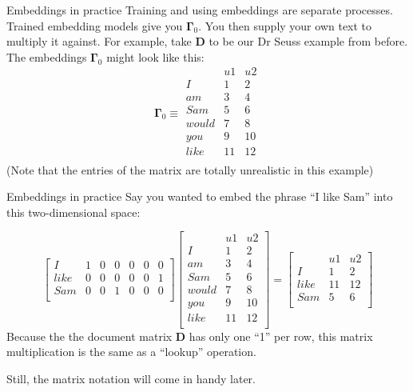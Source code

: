 \documentclass[10pt]{beamer}
\begin{document}
\begin{frame}{Embeddings in practice}
Training and using embeddings are separate processes.  Trained embedding models give you $\bm{\Gamma}_0$.  You then supply your own text to multiply it against.  For example, take $\bm{D}$ to be our Dr Seuss example from before.  The embeddings $\bm\Gamma_0$ might look like this:
\[  \bm{\Gamma}_0 \equiv
\begin{array}{c|cccccc}
     & u1 & u2 \\
     \hline
I    & 1 & 2 \\
am   & 3 & 4  \\
Sam  & 5 & 6   \\
would& 7 & 8  \\
you  & 9 & 10  \\
like & 11 & 12  \\
\end{array}\] 
(Note that the entries of the matrix are totally unrealistic in this example)

\end{frame}

\begin{frame}{Embeddings in practice}
Say you wanted to embed the phrase ``I like Sam'' into this two-dimensional space:

\[ 
\left[
\begin{array}{c|cccccc}
I    & 1 & 0  & 0   & 0     & 0   &  0 \\
like & 0 & 0  & 0   & 0     & 0   &  1 \\
Sam  & 0 & 0  & 1   & 0     & 0   &  0 \\
\end{array}\right]
\left[\begin{array}{c|cccccc}
     & u1 & u2 \\
     \hline
I    & 1 & 2 \\
am   & 3 & 4  \\
Sam  & 5 & 6   \\
would& 7 & 8  \\
you  & 9 & 10  \\
like & 11 & 12  \\
\end{array}\right] = 
\left[
\begin{array}{c|cccccc}
     & u1 & u2 \\
     \hline
I    & 1 & 2 \\
like & 11 & 12  \\
Sam  & 5 & 6   \\
\end{array}
\right]
\] 
Because the the document matrix $\bm{D}$ has only one ``1'' per row, this matrix multiplication is the same as a ``lookup'' operation.

Still, the matrix notation will come in handy later.

\end{frame}
\end{document}
